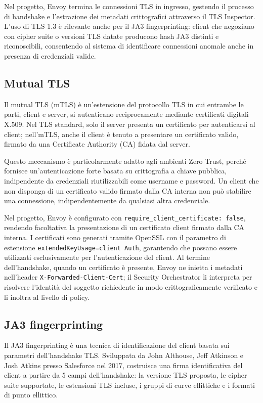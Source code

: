 Nel progetto, Envoy termina le connessioni TLS in ingresso, gestendo il processo di handshake e l'estrazione dei metadati crittografici attraverso il TLS Inspector. L'uso di TLS 1.3 è rilevante anche per il JA3 fingerprinting: client che negoziano con cipher suite o versioni TLS datate producono hash JA3 distinti e riconoscibili, consentendo al sistema di identificare connessioni anomale anche in presenza di credenziali valide.

\subsection{Mutual TLS}

Il mutual TLS (mTLS) è un'estensione del protocollo TLS in cui entrambe le parti, client e server, si autenticano reciprocamente mediante certificati digitali X.509. Nel TLS standard, solo il server presenta un certificato per autenticarsi al client; nell'mTLS, anche il client è tenuto a presentare un certificato valido, firmato da una Certificate Authority (CA) fidata dal server.

Questo meccanismo è particolarmente adatto agli ambienti Zero Trust, perché fornisce un'autenticazione forte basata su crittografia a chiave pubblica, indipendente da credenziali riutilizzabili come username e password. Un client che non disponga di un certificato valido firmato dalla CA interna non può stabilire una connessione, indipendentemente da qualsiasi altra credenziale. 

Nel progetto, Envoy è configurato con \texttt{require\_client\_certificate: false}, rendendo facoltativa la presentazione di un certificato client firmato dalla CA interna. I certificati sono generati tramite OpenSSL con il parametro di estensione \texttt{extendedKeyUsage=client Auth}, garantendo che possano essere utilizzati esclusivamente per l'autenticazione del client. Al termine dell'handshake, quando un certificato è presente, Envoy ne inietta i metadati nell'header \texttt{X-Forwarded-Client-Cert}; il Security Orchestrator li interpreta per risolvere l'identità del soggetto richiedente in modo crittograficamente verificato e li inoltra al livello di policy. 

\subsection{JA3 fingerprinting}

Il JA3 fingerprinting è una tecnica di identificazione del client basata sui parametri dell'handshake TLS. Sviluppata da John Althouse, Jeff Atkinson e Josh Atkins presso Salesforce nel 2017, costruisce una firma identificativa del client a partire da 5 campi dell'handshake: la versione TLS proposta, le cipher suite supportate, le estensioni TLS incluse, i gruppi di curve ellittiche e i formati di punto ellittico.

